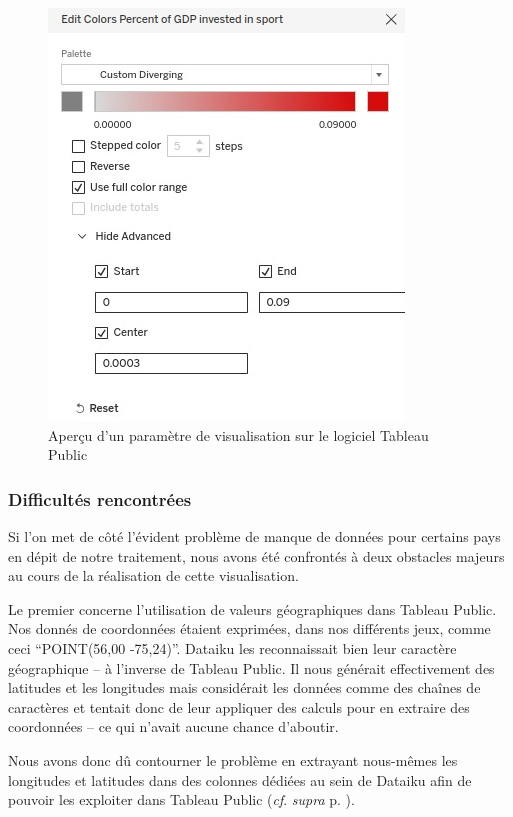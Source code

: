 \documentclass[hidelinks, 12pt]{report}
\begin{document}
\begin{center}
	\begin{figure}[H]
		\centering
		\setlength{\belowcaptionskip}{-35pt}
		\includegraphics[scale=0.5]{images/datavis-medals-world-center.png}
		\caption{Aperçu d'un paramètre de visualisation sur le logiciel Tableau Public}
		\label{param}
	\end{figure}
\end{center}

\subsubsection{Difficultés rencontrées}

Si l'on met de côté l'évident problème de manque de données pour certains pays en dépit de notre traitement, nous avons été confrontés à deux obstacles majeurs au cours de la réalisation de cette visualisation.

Le premier concerne l'utilisation de valeurs géographiques dans Tableau Public. Nos donnés de coordonnées étaient exprimées, dans nos différents jeux, comme ceci \enquote{POINT(56,00 -75,24)}. Dataiku les reconnaissait bien leur caractère géographique -- à l'inverse de Tableau Public. Il nous générait effectivement des latitudes et les longitudes mais considérait les données comme des chaînes de caractères et tentait donc de leur appliquer des calculs pour en extraire des coordonnées -- ce qui n'avait aucune chance d'aboutir.

Nous avons donc dû contourner le problème en extrayant nous-mêmes les longitudes et latitudes dans des colonnes dédiées au sein de Dataiku afin de pouvoir les exploiter dans Tableau Public (\textit{cf}. \textit{supra} p. \pageref{casse}).
\end{document}
